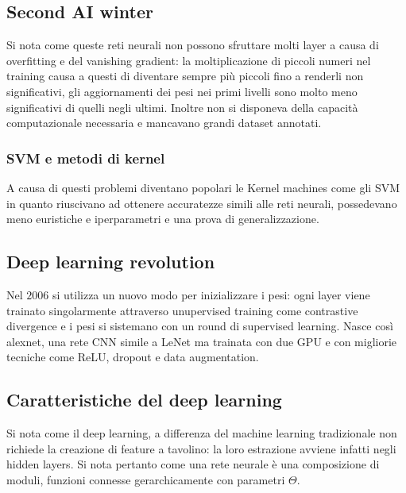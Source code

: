 	\subsection{Second AI winter}
	Si nota come queste reti neurali non possono sfruttare molti layer a causa di overfitting e del vanishing gradient: la moltiplicazione di piccoli numeri nel training causa a questi di diventare sempre pi\`u piccoli fino a renderli non significativi, gli aggiornamenti dei pesi nei primi livelli sono molto meno significativi di quelli negli ultimi.
	Inoltre non si disponeva della capacit\`a computazionale necessaria e mancavano grandi dataset annotati.

		\subsubsection{SVM e metodi di kernel}
		A causa di questi problemi diventano popolari le Kernel machines come gli SVM in quanto riuscivano ad ottenere accuratezze simili alle reti neurali, possedevano meno euristiche e iperparametri e una prova di generalizzazione.

	\subsection{Deep learning revolution}
	Nel $2006$ si utilizza un nuovo modo per inizializzare i pesi: ogni layer viene trainato singolarmente attraverso unupervised training come contrastive divergence e i pesi si sistemano con un round di supervised learning.
	Nasce cos\`i alexnet, una rete CNN simile a LeNet ma trainata con due GPU e con migliorie tecniche come ReLU, dropout e data augmentation.
	
	\subsection{Caratteristiche del deep learning}
	Si nota come il deep learning, a differenza del machine learning tradizionale non richiede la creazione di feature a tavolino: la loro estrazione avviene infatti negli hidden layers.
	Si nota pertanto come una rete neurale \`e una composizione di moduli, funzioni connesse gerarchicamente con parametri $\Theta$.

